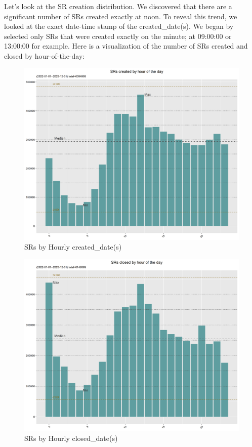 \documentclass[12pt, titlepage]{article}
\begin{document}
{	Let's look at the SR creation distribution. We discovered that there are a significant number of SRs created exactly at noon. To reveal this
	trend, we looked at the exact date-time stamp of the created\_date(s). We began by selected only SRs that were created exactly on the minute;
	at 09:00:00 or 13:00:00 for example.  Here is a visualization of the number of SRs created and closed by hour-of-the-day:
	
	\begin{figure}[H]
		 \centering
		 \includegraphics[width = \textwidth]{Created_Hourly_SR_count.png}
		 \caption{SRs by Hourly created\_date(s)}
		 \label{fig:hourly-created}
	\end{figure}	
	
	\begin{figure}[H]
		 \centering
		 \includegraphics[width = \textwidth]{Closed_Hourly_SR_count.png}
		 \caption{SRs by Hourly closed\_date(s)}
		 \label{fig:hourly-closed}
	\end{figure}	
	
}
\end{document}
